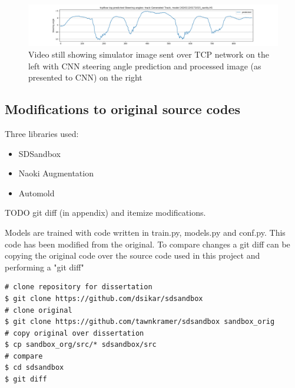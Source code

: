 \begin{figure}[ht]
 \centering 
 \includegraphics[width=\textwidth]{Figures/sa_GeneratedTrack_20201120171015_sanity.h5.png}
 \caption{Video still showing simulator image sent over TCP network on the left with CNN steering angle prediction and processed image (as presented to CNN) on the right}
 \label{fig:sa_GeneratedTrack_20201120171015_sanity} 
\end{figure}




\subsection{Modifications to original source codes}
Three libraries used:
\begin{itemize}
    \item SDSandbox
    \item Naoki Augmentation
    \item Automold
\end{itemize}
TODO git diff (in appendix) and itemize modifications.
    
Models are trained with code written in train.py, models.py and conf.py. This code has been modified from the original. To compare changes a git diff can be copying the original code over the source code used in this project and performing a "git diff"
\begin{verbatim}
# clone repository for dissertation
$ git clone https://github.com/dsikar/sdsandbox
# clone original
$ git clone https://github.com/tawnkramer/sdsandbox sandbox_orig
# copy original over dissertation
$ cp sandbox_org/src/* sdsandbox/src
# compare
$ cd sdsandbox 
$ git diff
\end{verbatim}


